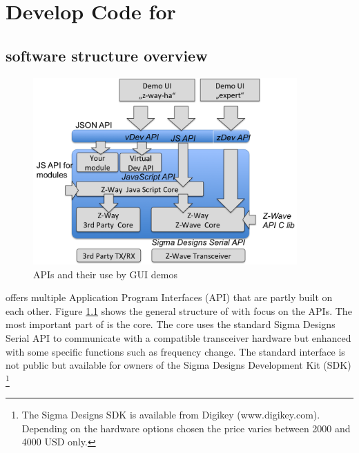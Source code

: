 \chapter{Develop Code for \zway}
\label{c:developer}

\section{\zway software structure overview}

\begin{figure}
\includegraphics[width=0.9\textwidth]{pngs/cap11/apis.png}
\caption{\zway APIs and their use by GUI demos}
\label{apis}
\end{figure}

\zway offers multiple Application Program Interfaces (API) that are partly built on each 
other. Figure \ref{apis} shows the general structure of \zway with focus on the APIs. The 
most important part of \zway is the \zwave core. The \zwave core uses the standard Sigma 
Designs Serial API to communicate with a \zwave compatible transceiver hardware but enhanced 
with some \zway specific functions such as frequency change. The standard interface is 
not public but available for owners of the Sigma Designs Development Kit (SDK)
\footnote{The Sigma Designs SDK is available from Digikey (www.digikey.com). Depending 
on the hardware options chosen the price varies between 2000 and 4000 USD only.}

